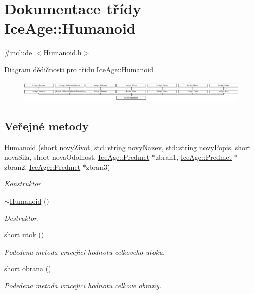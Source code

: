 \hypertarget{classIceAge_1_1Humanoid}{}\section{Dokumentace třídy Ice\+Age\+:\+:Humanoid}
\label{classIceAge_1_1Humanoid}


{\ttfamily \#include $<$Humanoid.\+h$>$}

Diagram dědičnosti pro třídu Ice\+Age\+:\+:Humanoid\begin{figure}[H]
\begin{center}
\leavevmode
\includegraphics[height=1.038961cm]{d5/d0d/classIceAge_1_1Humanoid}
\end{center}
\end{figure}
\subsection*{Veřejné metody}
\begin{DoxyCompactItemize}
\item 
\hyperlink{classIceAge_1_1Humanoid_aa569118f9afa5ec9ddac4a9ec813d4ba}{Humanoid} (short novy\+Zivot, std\+::string novy\+Nazev, std\+::string novy\+Popis, short nova\+Sila, short nova\+Odolnost, \hyperlink{classIceAge_1_1Predmet}{Ice\+Age\+::\+Predmet} $\ast$zbran1, \hyperlink{classIceAge_1_1Predmet}{Ice\+Age\+::\+Predmet} $\ast$zbran2, \hyperlink{classIceAge_1_1Predmet}{Ice\+Age\+::\+Predmet} $\ast$zbran3)
\begin{DoxyCompactList}\small\item\em Konstruktor. \end{DoxyCompactList}\item 
\hyperlink{classIceAge_1_1Humanoid_a1d77af44d2b10d85f162ae959b05816d}{$\sim$\+Humanoid} ()
\begin{DoxyCompactList}\small\item\em Destruktor. \end{DoxyCompactList}\item 
short \hyperlink{classIceAge_1_1Humanoid_aa8f63dfba3ef74a0666e9fb9c9e96df4}{utok} ()
\begin{DoxyCompactList}\small\item\em Podedena metoda vracejici hodnotu celkoveho utoku. \end{DoxyCompactList}\item 
short \hyperlink{classIceAge_1_1Humanoid_a76adfafa3855813fc09facab326ec87d}{obrana} ()
\begin{DoxyCompactList}\small\item\em Podedena metoda vracejici hodnotu celkove obrany. \end{DoxyCompactList}\end{DoxyCompactItemize}
